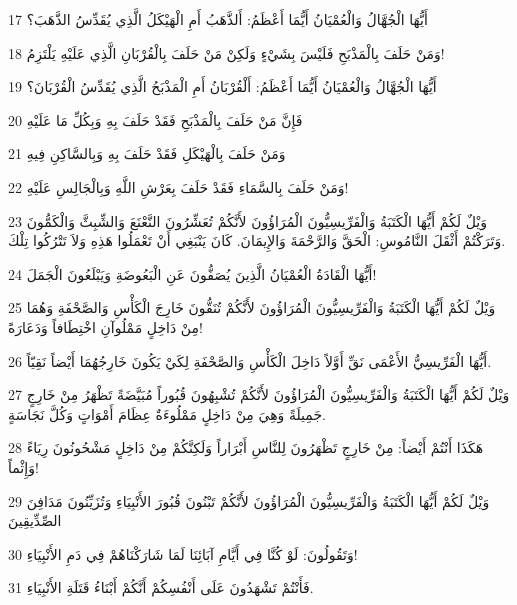 \par 17 أَيُّهَا الْجُهَّالُ وَالْعُمْيَانُ أَيُّمَا أَعْظَمُ: أَلذَّهَبُ أَمِ الْهَيْكَلُ الَّذِي يُقَدِّسُ الذَّهَبَ؟
\par 18 وَمَنْ حَلَفَ بِالْمَذْبَحِ فَلَيْسَ بِشَيْءٍ وَلَكِنْ مَنْ حَلَفَ بِالْقُرْبَانِ الَّذِي عَلَيْهِ يَلْتَزِمُ!
\par 19 أَيُّهَا الْجُهَّالُ وَالْعُمْيَانُ أَيُّمَا أَعْظَمُ: أَلْقُرْبَانُ أَمِ الْمَذْبَحُ الَّذِي يُقَدِّسُ الْقُرْبَانَ؟
\par 20 فَإِنَّ مَنْ حَلَفَ بِالْمَذْبَحِ فَقَدْ حَلَفَ بِهِ وَبِكُلِّ مَا عَلَيْهِ
\par 21 وَمَنْ حَلَفَ بِالْهَيْكَلِ فَقَدْ حَلَفَ بِهِ وَبِالسَّاكِنِ فِيهِ
\par 22 وَمَنْ حَلَفَ بِالسَّمَاءِ فَقَدْ حَلَفَ بِعَرْشِ اللَّهِ وَبِالْجَالِسِ عَلَيْهِ!
\par 23 وَيْلٌ لَكُمْ أَيُّهَا الْكَتَبَةُ وَالْفَرِّيسِيُّونَ الْمُرَاؤُونَ لأَنَّكُمْ تُعَشِّرُونَ النَّعْنَعَ وَالشِّبِثَّ وَالْكَمُّونَ وَتَرَكْتُمْ أَثْقَلَ النَّامُوسِ: الْحَقَّ وَالرَّحْمَةَ وَالإِيمَانَ. كَانَ يَنْبَغِي أَنْ تَعْمَلُوا هَذِهِ وَلاَ تَتْرُكُوا تِلْكَ.
\par 24 أَيُّهَا الْقَادَةُ الْعُمْيَانُ الَّذِينَ يُصَفُّونَ عَنِ الْبَعُوضَةِ وَيَبْلَعُونَ الْجَمَلَ!
\par 25 وَيْلٌ لَكُمْ أَيُّهَا الْكَتَبَةُ وَالْفَرِّيسِيُّونَ الْمُرَاؤُونَ لأَنَّكُمْ تُنَقُّونَ خَارِجَ الْكَأْسِ وَالصَّحْفَةِ وَهُمَا مِنْ دَاخِلٍ مَمْلُوآنِ اخْتِطَافاً وَدَعَارَةً!
\par 26 أَيُّهَا الْفَرِّيسِيُّ الأَعْمَى نَقِّ أَوَّلاً دَاخِلَ الْكَأْسِ وَالصَّحْفَةِ لِكَيْ يَكُونَ خَارِجُهُمَا أَيْضاً نَقِيّاً.
\par 27 وَيْلٌ لَكُمْ أَيُّهَا الْكَتَبَةُ وَالْفَرِّيسِيُّونَ الْمُرَاؤُونَ لأَنَّكُمْ تُشْبِهُونَ قُبُوراً مُبَيَّضَةً تَظْهَرُ مِنْ خَارِجٍ جَمِيلَةً وَهِيَ مِنْ دَاخِلٍ مَمْلُوءَةٌ عِظَامَ أَمْوَاتٍ وَكُلَّ نَجَاسَةٍ.
\par 28 هَكَذَا أَنْتُمْ أَيْضاً: مِنْ خَارِجٍ تَظْهَرُونَ لِلنَّاسِ أَبْرَاراً وَلَكِنَّكُمْ مِنْ دَاخِلٍ مَشْحُونُونَ رِيَاءً وَإِثْماً!
\par 29 وَيْلٌ لَكُمْ أَيُّهَا الْكَتَبَةُ وَالْفَرِّيسِيُّونَ الْمُرَاؤُونَ لأَنَّكُمْ تَبْنُونَ قُبُورَ الأَنْبِيَاءِ وَتُزَيِّنُونَ مَدَافِنَ الصِّدِّيقِينَ
\par 30 وَتَقُولُونَ: لَوْ كُنَّا فِي أَيَّامِ آبَائِنَا لَمَا شَارَكْنَاهُمْ فِي دَمِ الأَنْبِيَاءِ!
\par 31 فَأَنْتُمْ تَشْهَدُونَ عَلَى أَنْفُسِكُمْ أَنَّكُمْ أَبْنَاءُ قَتَلَةِ الأَنْبِيَاءِ.
